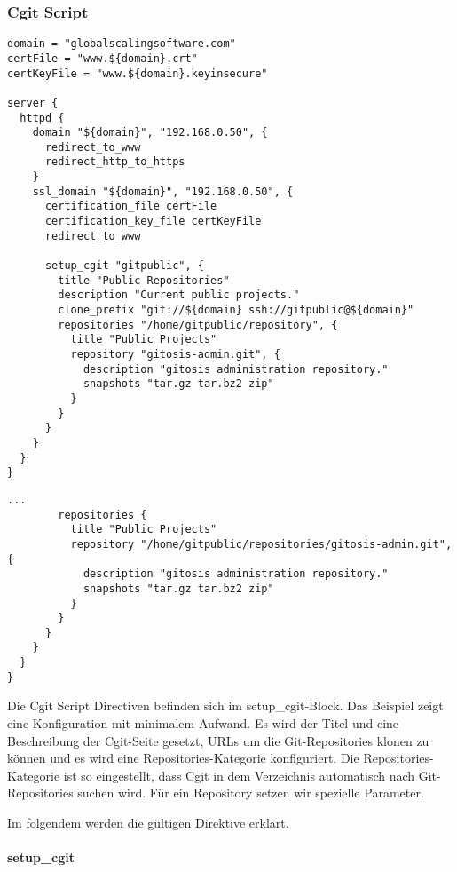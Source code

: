 \subsubsection{Cgit Script}

\begin{lstlisting}[style=Java, caption=Beispiel Cgit Script mit Scan-Path]
domain = "globalscalingsoftware.com"
certFile = "www.${domain}.crt"
certKeyFile = "www.${domain}.keyinsecure"

server {
  httpd {
    domain "${domain}", "192.168.0.50", {
      redirect_to_www
      redirect_http_to_https
    }
    ssl_domain "${domain}", "192.168.0.50", {
      certification_file certFile
      certification_key_file certKeyFile
      redirect_to_www

      setup_cgit "gitpublic", {
        title "Public Repositories"
        description "Current public projects."
        clone_prefix "git://${domain} ssh://gitpublic@${domain}"
        repositories "/home/gitpublic/repository", {
          title "Public Projects"
          repository "gitosis-admin.git", {
            description "gitosis administration repository."
            snapshots "tar.gz tar.bz2 zip"
          }
        }
      }
    }
  }
}
\end{lstlisting}

\begin{lstlisting}[style=Java, caption=Beispiel Cgit Script ohne Scan-Path]
...
        repositories {
          title "Public Projects"
          repository "/home/gitpublic/repositories/gitosis-admin.git", {
            description "gitosis administration repository."
            snapshots "tar.gz tar.bz2 zip"
          }
        }
      }
    }
  }
}
\end{lstlisting}

Die Cgit Script Directiven befinden sich im setup\_cgit-Block. Das Beispiel
zeigt eine Konfiguration mit minimalem Aufwand. Es wird der Titel und eine
Beschreibung der Cgit-Seite gesetzt, URLs um die Git-Repositories klonen zu
können und es wird eine Repositories-Kategorie konfiguriert. Die
Repositories-Kategorie ist so eingestellt, dass Cgit in dem Verzeichnis
automatisch nach Git-Repositories suchen wird. Für ein Repository setzen wir
spezielle Parameter.

Im folgendem werden die gültigen Direktive erklärt.

\paragraph{setup\_cgit}

